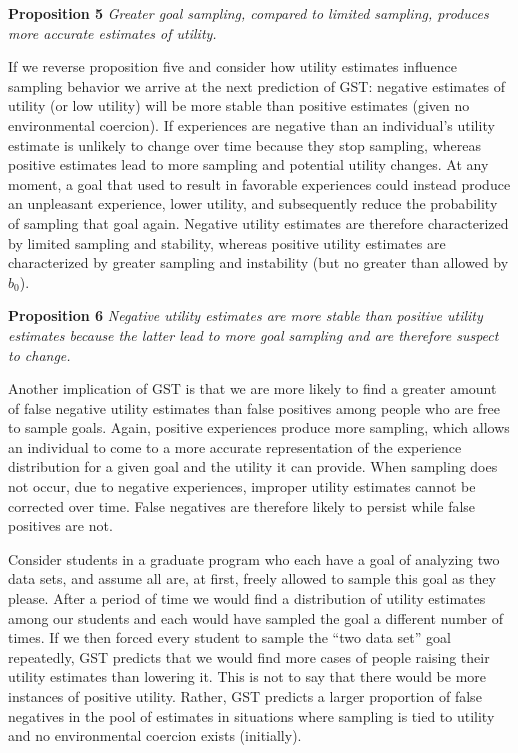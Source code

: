 \documentclass[english,man]{apa6}
\theoremstyle{definition}
\theoremstyle{definition}
\theoremstyle{definition}
\theoremstyle{remark}
\begin{document}
\textbf{Proposition 5} \emph{Greater goal sampling, compared to limited
sampling, produces more accurate estimates of utility.}

If we reverse proposition five and consider how utility estimates
influence sampling behavior we arrive at the next prediction of GST:
negative estimates of utility (or low utility) will be more stable than
positive estimates (given no environmental coercion). If experiences are
negative than an individual's utility estimate is unlikely to change
over time because they stop sampling, whereas positive estimates lead to
more sampling and potential utility changes. At any moment, a goal that
used to result in favorable experiences could instead produce an
unpleasant experience, lower utility, and subsequently reduce the
probability of sampling that goal again. Negative utility estimates are
therefore characterized by limited sampling and stability, whereas
positive utility estimates are characterized by greater sampling and
instability (but no greater than allowed by \(b_0\)).

\textbf{Proposition 6} \emph{Negative utility estimates are more stable
than positive utility estimates because the latter lead to more goal
sampling and are therefore suspect to change.}

Another implication of GST is that we are more likely to find a greater
amount of false negative utility estimates than false positives among
people who are free to sample goals. Again, positive experiences produce
more sampling, which allows an individual to come to a more accurate
representation of the experience distribution for a given goal and the
utility it can provide. When sampling does not occur, due to negative
experiences, improper utility estimates cannot be corrected over time.
False negatives are therefore likely to persist while false positives
are not.

Consider students in a graduate program who each have a goal of
analyzing two data sets, and assume all are, at first, freely allowed to
sample this goal as they please. After a period of time we would find a
distribution of utility estimates among our students and each would have
sampled the goal a different number of times. If we then forced every
student to sample the \enquote{two data set} goal repeatedly, GST
predicts that we would find more cases of people raising their utility
estimates than lowering it. This is not to say that there would be more
instances of positive utility. Rather, GST predicts a larger proportion
of false negatives in the pool of estimates in situations where sampling
is tied to utility and no environmental coercion exists (initially).
\end{document}
